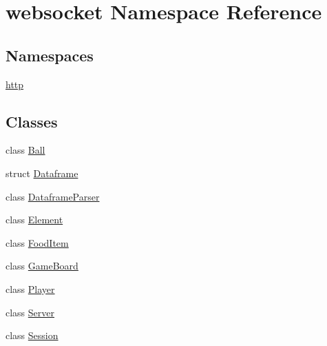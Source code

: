\hypertarget{namespacewebsocket}{}\section{websocket Namespace Reference}
\label{namespacewebsocket}
\subsection*{Namespaces}
\begin{DoxyCompactItemize}
\item 
 \hyperlink{namespacewebsocket_1_1http}{http}
\end{DoxyCompactItemize}
\subsection*{Classes}
\begin{DoxyCompactItemize}
\item 
class \hyperlink{classwebsocket_1_1Ball}{Ball}
\item 
struct \hyperlink{structwebsocket_1_1Dataframe}{Dataframe}
\item 
class \hyperlink{classwebsocket_1_1DataframeParser}{Dataframe\+Parser}
\item 
class \hyperlink{classwebsocket_1_1Element}{Element}
\item 
class \hyperlink{classwebsocket_1_1FoodItem}{Food\+Item}
\item 
class \hyperlink{classwebsocket_1_1GameBoard}{Game\+Board}
\item 
class \hyperlink{classwebsocket_1_1Player}{Player}
\item 
class \hyperlink{classwebsocket_1_1Server}{Server}
\item 
class \hyperlink{classwebsocket_1_1Session}{Session}
\end{DoxyCompactItemize}
